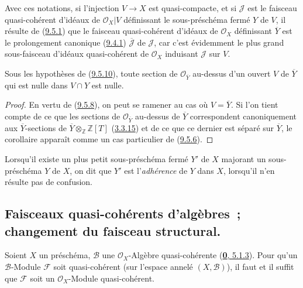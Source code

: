 Avec ces notations, si l'injection $V\to X$ est quasi-compacte, et si
$\mathscr{J}$ est le faisceau quasi-cohérent d'idéaux de
$\mathscr{O}_X|V$ définissant le sous-préschéma fermé $Y$ de $V$, il résulte
de (\hyperref[I.9.5.1-fr]{9.5.1}) que le faisceau quasi-cohérent d'idéaux de
$\mathscr{O}_X$ définissant $\overline{Y}$ est le prolongement canonique
(\hyperref[I.9.4.1-fr]{9.4.1}) $\overline{\mathscr{J}}$ de $\mathscr{J}$,
car c'est évidemment le plus grand sous-faisceau d'idéaux quasi-cohérent de
$\mathscr{O}_X$ induisant $\mathscr{J}$ sur $V$.
\begin{corollary}[9.5.11]
\label{I.9.5.11-fr}
Sous les hypothèses de (\hyperref[I.9.5.10-fr]{9.5.10}), toute section de
$\mathscr{O}_{\overline{Y}}$ au-dessus d'un ouvert $V$ de $\overline{Y}$
qui est nulle dans $V\cap Y$ est nulle.
\end{corollary}

\begin{proof}
En vertu de (\hyperref[I.9.5.8-fr]{9.5.8}), on peut se ramener au cas où
$V=\overline{Y}$. Si l'on tient compte de ce que les sections de
$\mathscr{O}_{\overline{Y}}$ au-dessus de $\overline{Y}$ correspondent
canoniquement aux $\overline{Y}$-sections de
$\overline{Y}\otimes_{\mathbb{Z}}\mathbb{Z}[T]$
(\hyperref[I.3.3.15-fr]{3.3.15}) et de ce que ce dernier est séparé sur
$\overline{Y}$, le corollaire apparaît comme un cas particulier de
(\hyperref[I.9.5.6-fr]{9.5.6}).
\end{proof}

Lorsqu'il existe un plus petit sous-préschéma fermé $Y'$ de $X$
majorant un sous-préschéma $Y$ de $X$, on dit que $Y'$ est
l'\emph{adhérence} de $Y$ dans $X$, lorsqu'il n'en résulte pas de
confusion.

\subsection{Faisceaux quasi-cohérents d'algèbres~; changement du faisceau
structural.}
\label{subsection:I.9.6-fr}

\begin{proposition}[9.6.1]
\label{I.9.6.1-fr}
Soient $X$ un préschéma, $\mathscr{B}$ une $\mathscr{O}_X$-Algèbre
quasi-cohérente (\hyperref[0.5.1.3-fr]{\textbf{0}, 5.1.3}). Pour qu'un
$\mathscr{B}$-Module $\mathscr{F}$ soit quasi-cohérent (sur l'espace
annelé $(X,\mathscr{B})$), il faut et il suffit que $\mathscr{F}$ soit un
$\mathscr{O}_X$-Module quasi-cohérent.
\end{proposition}

